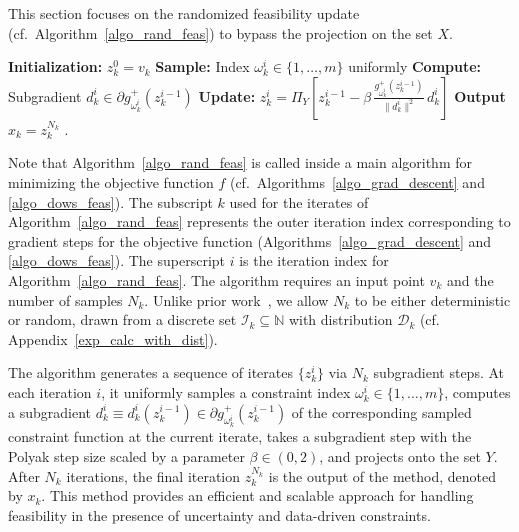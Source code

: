 \documentclass{article}
\theoremstyle{plain}
\theoremstyle{definition}
\theoremstyle{remark}
\begin{document}
This section focuses on the randomized feasibility update (cf.\ Algorithm~\ref{algo_rand_feas}) to bypass the projection on the set $X$.
%
%
%
\begin{algorithm}
		\caption{Randomized Feasibility}
		\label{algo_rand_feas}
		\begin{algorithmic}[1]
                \STATE \textbf{Initialization:} $z_{k}^0=v_{k}$
                \STATE \textbf{Sample:} Index $\omega_{k}^{i} \in \{1,\ldots,m\}$ uniformly
                \STATE \textbf{Compute:} Subgradient $d_{k}^{i} \in \partial g^+_{\omega_{k}^{i}}(z_k^{i-1})$ 
                \STATE \textbf{Update:} $z_{k}^i
   = \Pi_{Y} \left[z_{k}^{i-1} - \beta\, \frac{g^+_{\omega_{k}^{i}}(z_{k}^{i-1})}{\|d_{k}^{i}\|^2}\, d_{k}^{i}\right]$
                \ENDFOR
                \STATE \textbf{Output} $x_{k}=z_{k}^{N_{k}}$ .
		\end{algorithmic}
\end{algorithm}	
%
%
Note that Algorithm~\ref{algo_rand_feas} is called inside a main algorithm for minimizing the objective function $f$ (cf.\ Algorithms~\ref{algo_grad_descent} and \ref{algo_dows_feas}). The subscript $k$ used for the iterates of Algorithm~\ref{algo_rand_feas} represents the outer iteration index corresponding to gradient steps for the  objective function (Algorithms~\ref{algo_grad_descent} and \ref{algo_dows_feas}). The superscript $i$ is the iteration index for Algorithm~\ref{algo_rand_feas}. The algorithm requires an input point $v_k$ and the number of samples $N_k$. Unlike prior work~\cite{nedic2010random, nedic2019random, necoara2022stochastic, singh2024stochastic, chakraborty2024randomized, chakraborty2025randomized}, we allow $N_k$ to be either deterministic or random, drawn from a discrete set $\mathcal{I}_k\subseteq\mathbb{N}$ with distribution $\mathcal{D}_{k}$ (cf. Appendix~\ref{exp_calc_with_dist}).

The algorithm generates a sequence of iterates $\{z_k^i\}$ via $N_k$ subgradient steps. At each iteration $i$, it uniformly samples a constraint index $\omega_k^i \in \{1,\ldots,m\}$, computes a subgradient $d_{k}^{i} \equiv d_{k}^{i}(z_k^{i-1}) \in \partial g^+_{\omega_{k}^{i}}(z_k^{i-1})$ of the corresponding sampled constraint function at the current iterate, takes a subgradient step with the Polyak step size \cite{polyak1969minimization, polyak2001random} scaled by a parameter $\beta \in (0, 2)$, and projects onto the set $Y$. After $N_k$ iterations, the final iteration $z_k^{N_k}$ is the output of the method, denoted by $x_k$. This method provides an efficient and scalable approach for handling feasibility in the presence of uncertainty and data-driven constraints.
\end{document}
